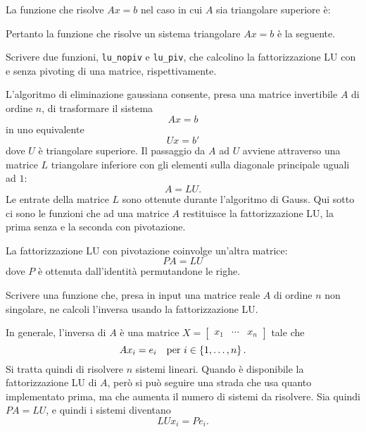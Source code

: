 La funzione che risolve \(Ax = b\) nel caso in cui \(A\) sia triangolare superiore è:



Pertanto la funzione che risolve un sistema triangolare \(Ax = b\) è la seguente.




\begin{esercizio}
Scrivere due funzioni, \lstinline£lu_nopiv£ e \lstinline£lu_piv£, che calcolino la fattorizzazione LU con e senza pivoting di una matrice, rispettivamente.
\end{esercizio}

L'algoritmo di eliminazione gaussiana consente, presa una matrice invertibile \(A\) di ordine \(n\), di trasformare il sistema
\[A x = b\]
in uno equivalente
\[U x = b'\]
dove \(U\) è triangolare superiore. Il passaggio da \(A\) ad \(U\) avviene attraverso una matrice \(L\) triangolare inferiore con gli elementi sulla diagonale principale uguali ad \(1\):
\[A = LU .\]
Le entrate della matrice \(L\) sono ottenute durante l'algoritmo di Gauss. Qui sotto ci sono le funzioni che ad una matrice \(A\) restituisce la fattorizzazione LU, la prima senza e la seconda con pivotazione. 



La fattorizzazione LU con pivotazione coinvolge un'altra matrice:
\[PA = LU\]
dove \(P\) è ottenuta dall'identità permutandone le righe.



\begin{esercizio}
Scrivere una funzione che, presa in input una matrice reale \(A\) di ordine \(n\) non singolare, ne calcoli l'inversa usando la fattorizzazione LU.
\end{esercizio}

In generale, l'inversa di \(A\) è una matrice \(X = \begin{bmatrix} x_1 & \cdots{} & x_n\end{bmatrix}\) tale che
\[A x_i = e_i \quad\text{per } i \in \left\{1, \dots{}, n\right\} .\]
Si tratta quindi di risolvere \(n\) sistemi lineari. Quando è disponibile la fattorizzazione LU di \(A\), però si può seguire una strada che usa quanto implementato prima, ma che aumenta il numero di sistemi da risolvere. Sia quindi \(PA = LU\), e quindi i sistemi diventano
\[LU x_i = P e_i .\]

